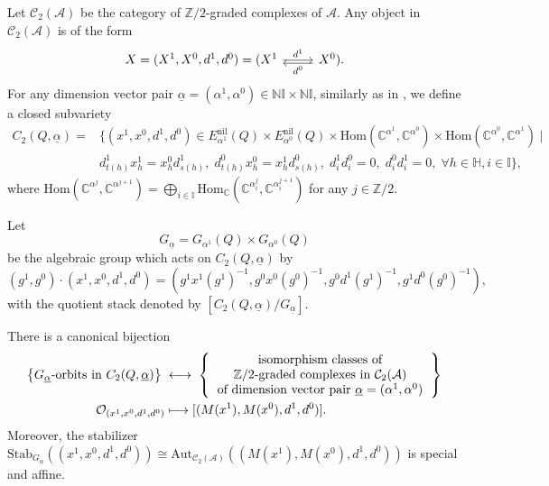 \documentclass[12pt]{amsart}
\theoremstyle{definition}
\numberwithin{equation}{section}
\begin{document}
Let $ \mathcal{C}_2(\mathcal{A}) $ be the category of $ \mathbb{Z}/2 $-graded complexes of $ \mathcal{A} $. 
Any object in $ \mathcal{C}_2(\mathcal{A}) $ is of the form
\[\begin{tikzcd}
    X=(X^1,X^0,d^1,d^0) = (X^1 \arrow[r,"d^1"] & X^0 \arrow[l, shift left,"d^0"]).
\end{tikzcd}\]
For any dimension vector pair 
$ \underline{\alpha} = (\alpha^1, \alpha^0) \in \mathbb{N}\mathbb{I} \times \mathbb{N}\mathbb{I} $, similarly as in \cite[Section 3.2]{FLX24}, we define a closed subvariety
\begin{align*}
    C_2(Q, \underline{\alpha}) =& \{ (x^1, x^0, d^1, d^0) \in E_{\alpha^1}^{\mathrm{nil}}(Q) \times E_{\alpha^0}^{\mathrm{nil}}(Q) \times \mathrm{Hom}(\mathbb{C}^{\alpha^1}, \mathbb{C}^{\alpha^0}) 
     \times \mathrm{Hom}(\mathbb{C}^{\alpha^0}, \mathbb{C}^{\alpha^1}) \mid \\
      &d^1_{t(h)} x_h^1 = x_h^0 d^1_{s(h)}, \; d^0_{t(h)} x_h^0 = x_h^1 d^0_{s(h)}, \; d_i^1 d_i^0 = 0, \; d_i^0 d_i^1 = 0, \; \forall h \in \mathbb{H}, i \in \mathbb{I} \},
\end{align*}
where $ \mathrm{Hom}(\mathbb{C}^{\alpha^j}, \mathbb{C}^{\alpha^{j+1}}) = \bigoplus_{i \in \mathbb{I}} \mathrm{Hom}_{\mathbb{C}}(\mathbb{C}^{\alpha_i^j}, \mathbb{C}^{\alpha_i^{j+1}})$ for any $  j \in \mathbb{Z}/2 $.

Let
\[
G_{\underline{\alpha}} = G_{\alpha^1}(Q) \times G_{\alpha^0}(Q)
\]
be the algebraic group which acts on $C_2(Q, \underline{\alpha})$ by
\[(g^1, g^0) \cdot (x^1, x^0, d^1, d^0) 
= (g^1 x^1 (g^1)^{-1}, g^0 x^0 (g^0)^{-1}, g^0 d^1 (g^1)^{-1}, g^1 d^0 (g^0)^{-1}), \]
with the quotient stack denoted by $ [C_2(Q,\underline{\alpha})/G_{\underline{\alpha}}] $.

There is a canonical bijection
\begin{align*}
\left\{
  G_{\underline{\alpha}}\text{-orbits in } C_2(Q,\underline{\alpha})
\right\}
\;&\longleftrightarrow\;
    \left\{
  \begin{tabular}{c}
      isomorphism classes of   \\
      $\mathbb{Z}/2$-graded complexes in $\mathcal{C}_2(\mathcal{A})$ \\
      of dimension vector pair $ \underline{\alpha}=(\alpha^1,\alpha^0) $
  \end{tabular}
\right\}\\
\mathcal{O}_{(x^1, x^0, d^1, d^0)} &\longmapsto [(M(x^1),M(x^0),d^1,d^0)].
\end{align*}
Moreover, the stabilizer $ \mathrm{Stab}_{G_{\underline{\alpha}}}((x^1, x^0, d^1, d^0)) \cong \mathrm{Aut}_{\mathcal{C}_2(\mathcal{A})} ((M(x^1),M(x^0),d^1,d^0)) $ is special and affine.
\end{document}
